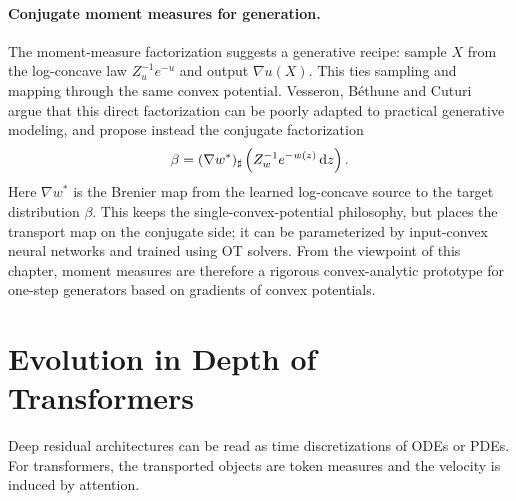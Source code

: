 \paragraph{Conjugate moment measures for generation.}
The moment-measure factorization suggests a generative recipe: sample $X$ from the log-concave law $Z_u^{-1}e^{-u}$ and output $\nabla u(X)$. This ties sampling and mapping through the same convex potential. Vesseron, B\'ethune and Cuturi~\cite{VesseronBethuneCuturi2025ConjugateMomentMeasures} argue that this direct factorization can be poorly adapted to practical generative modeling, and propose instead the conjugate factorization
\begin{equation}\label{eq-conjugate-moment-measure}
	\beta
	=
	(\nabla w^*)_\sharp
	\left(Z_w^{-1}e^{-w(z)}\,\mathrm{d} z\right).
\end{equation}
Here $\nabla w^*$ is the Brenier map from the learned log-concave source to the target distribution $\beta$. This keeps the single-convex-potential philosophy, but places the transport map on the conjugate side; it can be parameterized by input-convex neural networks and trained using OT solvers. From the viewpoint of this chapter, moment measures are therefore a rigorous convex-analytic prototype for one-step generators based on gradients of convex potentials.

\section{Evolution in Depth of Transformers}
\label{sec-transformer-depth-evolution}

Deep residual architectures can be read as time discretizations of ODEs or PDEs. For transformers, the transported objects are token measures and the velocity is induced by attention.

